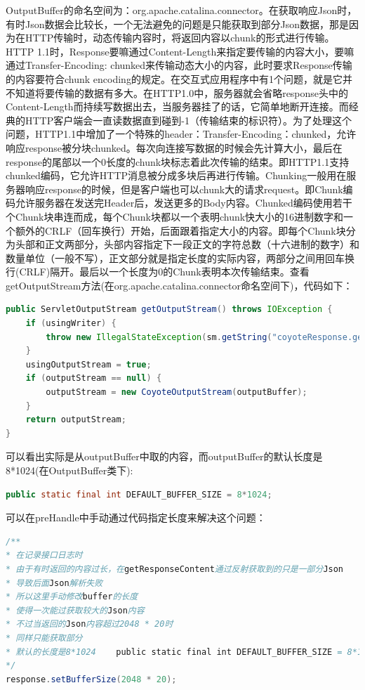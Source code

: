 \documentclass[11pt,fleqn]{book}
\numberwithin{dummy}{section}
\theoremstyle{ocrenumbox}
\theoremstyle{blacknumex}
\theoremstyle{blacknumbox}
\theoremstyle{ocrenum}
\newlength\esp
\begin{document}
OutputBuffer的命名空间为：org.apache.catalina.connector。在获取响应Json时，有时Json数据会比较长，一个无法避免的问题是只能获取到部分Json数据，那是因为在HTTP传输时，动态传输内容时，将返回内容以chunk的形式进行传输。HTTP 1.1时，Response要嘛通过Content-Length来指定要传输的内容大小，要嘛通过Transfer-Encoding: chunked来传输动态大小的内容，此时要求Response传输的内容要符合chunk encoding的规定。在交互式应用程序中有1个问题，就是它并不知道将要传输的数据有多大。在HTTP1.0中，服务器就会省略response头中的Content-Length而持续写数据出去，当服务器挂了的话，它简单地断开连接。而经典的HTTP客户端会一直读数据直到碰到-1（传输结束的标识符）。为了处理这个问题，HTTP1.1中增加了一个特殊的header：Transfer-Encoding：chunked，允许响应response被分块chunked。每次向连接写数据的时候会先计算大小，最后在response的尾部以一个0长度的chunk块标志着此次传输的结束。即HTTP1.1支持chunked编码，它允许HTTP消息被分成多块后再进行传输。Chunking一般用在服务器响应response的时候，但是客户端也可以chunk大的请求request。即Chunk编码允许服务器在发送完Header后，发送更多的Body内容。Chunked编码使用若干个Chunk块串连而成，每个Chunk块都以一个表明chunk快大小的16进制数字和一个额外的CRLF（回车换行）开始，后面跟着指定大小的内容。即每个Chunk块分为头部和正文两部分，头部内容指定下一段正文的字符总数（十六进制的数字）和数量单位（一般不写），正文部分就是指定长度的实际内容，两部分之间用回车换行(CRLF)隔开。最后以一个长度为0的Chunk表明本次传输结束。查看getOutputStream方法(在org.apache.catalina.connector命名空间下)，代码如下：

\begin{lstlisting}[language=Java]
public ServletOutputStream getOutputStream() throws IOException {
	if (usingWriter) {
		throw new IllegalStateException(sm.getString("coyoteResponse.getOutputStream.ise"));
	}
	usingOutputStream = true;
	if (outputStream == null) {
		outputStream = new CoyoteOutputStream(outputBuffer);
	}
	return outputStream;
}
\end{lstlisting}

可以看出实际是从outputBuffer中取的内容，而outputBuffer的默认长度是8*1024(在OutputBuffer类下):

\begin{lstlisting}[language=Java]
public static final int DEFAULT_BUFFER_SIZE = 8*1024;
\end{lstlisting}

可以在preHandle中手动通过代码指定长度来解决这个问题：

\begin{lstlisting}[language=Java]
/**
* 在记录接口日志时
* 由于有时返回的内容过长，在getResponseContent通过反射获取到的只是一部分Json
* 导致后面Json解析失败
* 所以这里手动修改buffer的长度
* 使得一次能过获取较大的Json内容
* 不过当返回的Json内容超过2048 * 20时
* 同样只能获取部分
* 默认的长度是8*1024    public static final int DEFAULT_BUFFER_SIZE = 8*1024;
*/
response.setBufferSize(2048 * 20);
\end{lstlisting}
\end{document}
